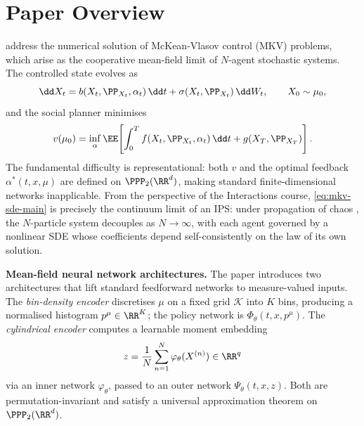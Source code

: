 \documentclass[11pt]{article}
\begin{document}
\section{Paper Overview}

\citet{pham2024mfnn} address the numerical solution of McKean-Vlasov control (MKV) problems, which arise as the cooperative mean-field limit of $N$-agent stochastic systems. The controlled state evolves as
\begin{equation}\label{eq:mkv-sde-main}
  \dd X_t = b(X_t, \PP_{X_t}, \alpha_t)\,\dd t + \sigma(X_t, \PP_{X_t})\,\dd W_t, \qquad X_0 \sim \mu_0,
\end{equation}
and the social planner minimises
\begin{equation}\label{eq:mkv-cost-main}
  v(\mu_0) = \inf_\alpha \EE\!\left[\int_0^T f(X_t, \PP_{X_t}, \alpha_t)\,\dd t + g(X_T, \PP_{X_T})\right].
\end{equation}
The fundamental difficulty is representational: both $v$ and the optimal feedback $\alpha^*(t, x, \mu)$ are defined on $\PPP_2(\RR^d)$, making standard finite-dimensional networks inapplicable. From the perspective of the Interactions course, \eqref{eq:mkv-sde-main} is precisely the continuum limit of an IPS: under propagation of chaos \citep{sznitman1991propagation}, the $N$-particle system decouples as $N \to \infty$, with each agent governed by a nonlinear SDE whose coefficients depend self-consistently on the law of its own solution.

\textbf{Mean-field neural network architectures.} The paper introduces two architectures that lift standard feedforward networks to measure-valued inputs. The \emph{bin-density encoder} discretises $\mu$ on a fixed grid $\mathcal{K}$ into $K$ bins, producing a normalised histogram $p^\mu \in \RR^K$; the policy network is $\Phi_\theta(t, x, p^\mu)$. The \emph{cylindrical encoder} computes a learnable moment embedding
\begin{equation}\label{eq:cylindrical-main}
  z = \frac{1}{N}\sum_{n=1}^N \varphi_\theta(X^{(n)}) \in \RR^q
\end{equation}
via an inner network $\varphi_\theta$, passed to an outer network $\Psi_\theta(t, x, z)$. Both are permutation-invariant and satisfy a universal approximation theorem on $\PPP_2(\RR^d)$.
\end{document}
